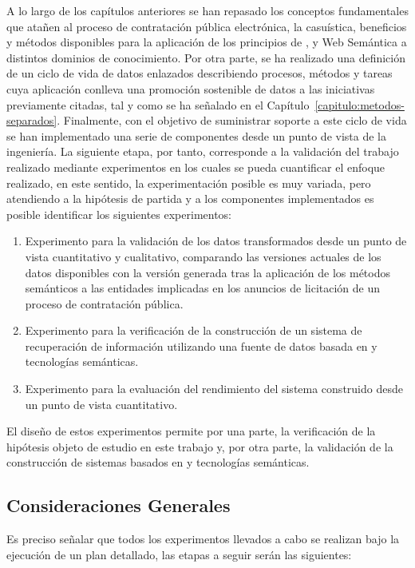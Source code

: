 A lo largo de los capítulos anteriores se han repasado los conceptos fundamentales que atañen 
al proceso de contratación pública electrónica, la casuística, beneficios y métodos disponibles 
para la aplicación de los principios de \opendata, \linkeddata y Web Semántica a distintos dominios 
de conocimiento. Por otra parte, se ha realizado una definición de un ciclo de vida de datos enlazados 
describiendo procesos, métodos y tareas cuya aplicación conlleva una promoción sostenible de datos a las iniciativas 
previamente citadas, tal y como se ha señalado en el Capítulo~\ref{capitulo:metodos-separados}. Finalmente, con el objetivo 
de suministrar soporte a este ciclo de vida se han implementado una serie de componentes desde un punto de vista de la 
ingeniería. La siguiente etapa, por tanto, corresponde a la validación del trabajo realizado mediante experimentos en los 
cuales se pueda cuantificar el enfoque realizado, en este sentido, la experimentación posible es muy variada, pero atendiendo 
a la hipótesis de partida y a los componentes implementados es posible identificar los siguientes experimentos:

\begin{enumerate}
 \item Experimento para la validación de los datos transformados desde un punto de vista cuantitativo y cualitativo, comparando las versiones 
actuales de los datos disponibles con la versión generada tras la aplicación de los métodos semánticos a las entidades 
implicadas en los anuncios de licitación de un proceso de contratación pública.
\item Experimento para la verificación de la construcción de un sistema de recuperación de información utilizando una fuente 
de datos basada en \linkeddata y tecnologías semánticas.
\item Experimento para la evaluación del rendimiento del sistema construido desde un punto de vista cuantitativo.

\end{enumerate}

El diseño de estos experimentos permite por una parte, la verificación de la hipótesis objeto de estudio en este trabajo y, por otra parte, 
la validación de la construcción de sistemas basados en \linkeddata y tecnologías semánticas.

\subsection{Consideraciones Generales}\label{exp-general}
Es preciso señalar que todos los experimentos llevados a cabo se realizan 
bajo la ejecución de un plan detallado, las etapas a seguir serán las siguientes:

